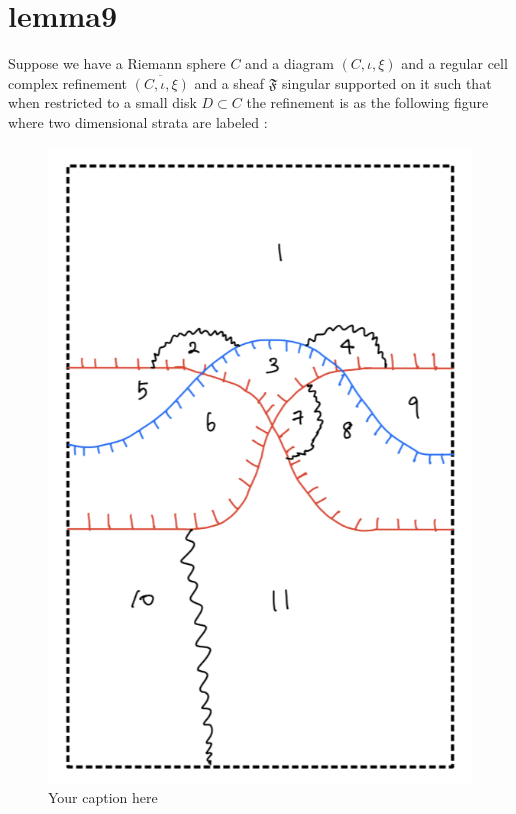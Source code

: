 \section{lemma9}
\begin{lemma}
\end{lemma}

Suppose we have a Riemann sphere $C$ and a diagram $(C,\iota,\xi)$ and a regular cell complex refinement $\overline{(C,\iota,\xi)}$ and a sheaf $\mathfrak{F}$ singular supported on it such that when restricted to a small disk $D\subset C$ the refinement is as the following figure where two dimensional strata are labeled :


\begin{figure}[H] %
    \centering
    \includegraphics[scale=0.95]{diagrams/lemma9/1.png} %
    \caption{Your caption here}
    \label{fig:your-label}
\end{figure}

